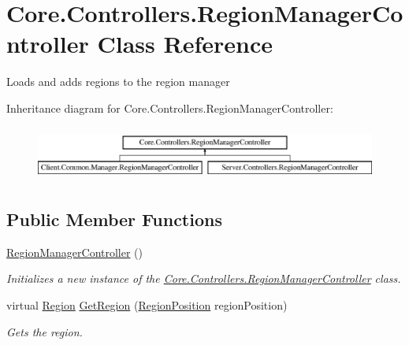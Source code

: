 \hypertarget{classCore_1_1Controllers_1_1RegionManagerController}{}\section{Core.\+Controllers.\+Region\+Manager\+Controller Class Reference}
\label{classCore_1_1Controllers_1_1RegionManagerController}


Loads and adds regions to the region manager  


Inheritance diagram for Core.\+Controllers.\+Region\+Manager\+Controller\+:\begin{figure}[H]
\begin{center}
\leavevmode
\includegraphics[height=1.812298cm]{classCore_1_1Controllers_1_1RegionManagerController}
\end{center}
\end{figure}
\subsection*{Public Member Functions}
\begin{DoxyCompactItemize}
\item 
\hyperlink{classCore_1_1Controllers_1_1RegionManagerController_aeea73e7911e9a19ff686d12db8f65a9c}{Region\+Manager\+Controller} ()
\begin{DoxyCompactList}\small\item\em Initializes a new instance of the \hyperlink{classCore_1_1Controllers_1_1RegionManagerController}{Core.\+Controllers.\+Region\+Manager\+Controller} class. \end{DoxyCompactList}\item 
virtual \hyperlink{classCore_1_1Models_1_1Region}{Region} \hyperlink{classCore_1_1Controllers_1_1RegionManagerController_a1ce55cf6fb0ba5f0b5711e70ffb86467}{Get\+Region} (\hyperlink{classCore_1_1Models_1_1RegionPosition}{Region\+Position} region\+Position)
\begin{DoxyCompactList}\small\item\em Gets the region. \end{DoxyCompactList}\end{DoxyCompactItemize}
